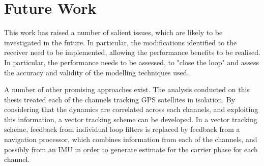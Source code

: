 
\section{Future Work}
This work has raised a number of salient issues, which are likely to be investigated in the future.
In particular, the modifications identified to the receiver need to be implemented, allowing the performance benefits to be realised. In particular, the performance needs to be assessed, to "close the loop" and assess the accuracy and validity of the modelling techniques used.

A number of other promising approaches exist. The analysis conducted on this thesis treated each of the channels tracking GPS satellites in isolation. By considering that the dynamics are correlated across each channels, and exploiting this information, a vector tracking scheme can be developed. In a vector tracking scheme, feedback from individual loop filters is replaced by feedback from a navigation processor, which combines information from each of the channels, and possibly from an IMU in order to generate estimate for the carrier phase for each channel. 








